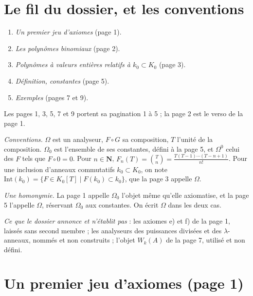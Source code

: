 \documentclass[11pt,a4paper]{article}
\begin{document}
\section*{Le fil du dossier, et les conventions}

\begin{enumerate}
\item[1.] \emph{Un premier jeu d'axiomes} (page 1).
\item[2.] \emph{Les polynômes binomiaux} (page 2).
\item[3.] \emph{Polynômes à valeurs entières relatifs à $k_{0} \subset K_{0}$}
(page 3).
\item[4.] \emph{Définition, constantes} (page 5).
\item[5.] \emph{Exemples} (pages 7 et 9).
\end{enumerate}

Les pages 1, 3, 5, 7 et 9 portent sa pagination 1 à 5 ; la page 2 est le verso
de la page 1.

\emph{Conventions.} $\Omega$ est un analyseur, $F \circ G$ sa composition, $T$
l'unité de la composition. $\Omega_{0}$ est l'ensemble de ses constantes, défini
à la page 5, et $\Omega^{0}$ celui des $F$ tels que $F \circ 0 = 0$. Pour
$n \in \mathbf{N}$,
$F_{n}(T) = \binom{T}{n} = \frac{T(T-1)\cdots(T-n+1)}{n!}$. Pour une inclusion
d'anneaux commutatifs $k_{0} \subset K_{0}$, on note
$\mathrm{Int}(k_{0}) = \{F \in K_{0}[T] \mid F(k_{0}) \subset k_{0}\}$, que la
page 3 appelle $\Omega$.

\emph{Une homonymie.} La page 1 appelle $\Omega_{0}$ l'objet même qu'elle
axiomatise, et la page 5 l'appelle $\Omega$, réservant $\Omega_{0}$ aux
constantes. On écrit $\Omega$ dans les deux cas.

\emph{Ce que le dossier annonce et n'établit pas} : les axiomes e) et f) de la
page 1, laissés sans second membre ; les analyseurs des puissances divisées et
des $\lambda$-anneaux, nommés et non construits ; l'objet $W_{k}(A)$ de la page
7, utilisé et non défini.

\section*{Un premier jeu d'axiomes (page 1)}
\end{document}
